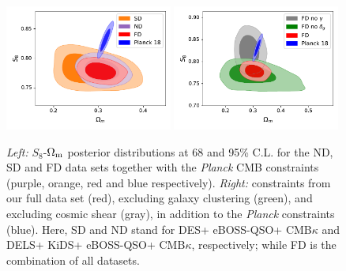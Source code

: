 \documentclass[a4paper,11pt]{article}
\newcommand{\Om}{\Omega_{\rm m}}
\newcommand{\cmbk}{CMB$\kappa$\xspace}
\newcommand{\des}{DES\xspace}
\newcommand{\kids}{KiDS\xspace}
\newcommand{\planck}{{\sl Planck}\xspace}
\newcommand{\eboss}{eBOSS-QSO\xspace}
\newcommand{\dls}{DELS\xspace}
\newcommand{\northd}{ND\xspace}
\newcommand{\southd}{SD\xspace}
\newcommand{\alld}{FD\xspace}
\begin{document}
      \begin{figure}
        \centering
        \includegraphics[width=0.49\textwidth]{figures/FD_lcdm_s8.pdf}
        \includegraphics[width=0.49\textwidth]{figures/FD_lcdm_s8_2.pdf}
        \caption{{\sl Left:} $S_8$-$\Om$ posterior distributions at 68 and 95\% C.L. for the \northd, \southd and \alld data sets together with the \planck CMB constraints (purple, orange, red and blue respectively). {\sl Right:} constraints from our full data set (red), excluding galaxy clustering (green), and excluding cosmic shear (gray), in addition to the \planck constraints (blue). Here, \southd and \northd stand for \des + \eboss + \cmbk and \dls + \kids + \eboss + \cmbk, respectively; while \alld is the combination of all datasets.}
        \label{fig:all_lcdm_s8}
      \end{figure}
 
\end{document}
